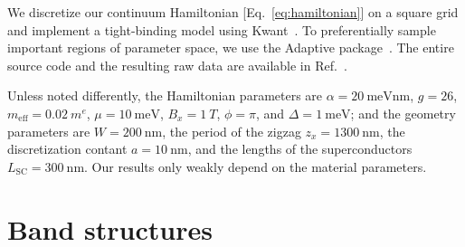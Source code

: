 We discretize our continuum Hamiltonian [Eq.~\eqref{eq:hamiltonian}] on a square grid and implement a tight-binding model using Kwant~\cite{Groth2014}.
To preferentially sample important regions of parameter space, we use the Adaptive package~\cite{Nijholt2019}.
The entire source code and the resulting raw data are available in Ref.~\cite{Laeven2019b}.

Unless noted differently, the Hamiltonian parameters are $\alpha=\SI{20}{\meV \nm}$, $g=26$, $m_\text{eff}=\SI{0.02}{\electronmass}$, $\mu=\SI{10}{\meV}$, $B_x=\SI{1}{T}$, $\phi=\pi$, and $\Delta=\SI{1}{\meV}$; and the geometry parameters are $W=\SI{200}{\nm}$, the period of the zigzag $z_x=\SI{1300}{\nm}$, the discretization contant $a=\SI{10}{\nm}$, and the lengths of the superconductors $L_\textrm{SC}=\SI{300}{\nm}$.
Our results only weakly depend on the material parameters.


\section{Band structures}\label{sec:band_structures}

